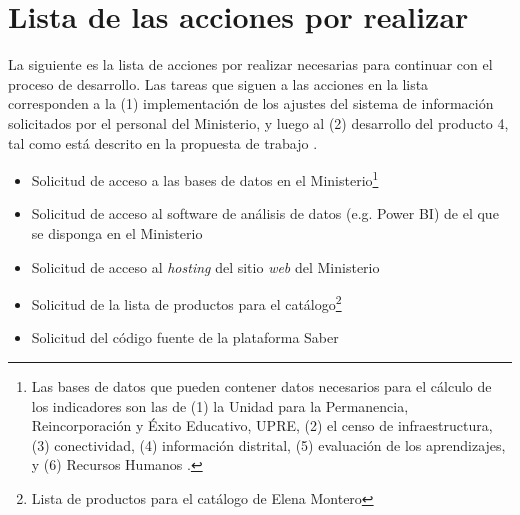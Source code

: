 \documentclass[9pt,a4paper]{IEEEtran}
\begin{document}
\section{Lista de las acciones por realizar}

La siguiente es la lista de acciones por realizar necesarias para continuar con el proceso de desarrollo. Las tareas que siguen a las acciones en la lista corresponden a la (1) implementaci\'on de los ajustes del sistema de informaci\'on solicitados por el personal del Ministerio, y luego al (2) desarrollo del producto 4, tal como est\'a descrito en la propuesta de trabajo \cite{prop}.

\begin{itemize}
	\item Solicitud de acceso a las bases de datos en el Ministerio\footnote{Las bases de datos que pueden contener datos necesarios para el c\'alculo de los indicadores son las de (1) la Unidad para la Permanencia, Reincorporaci\'on y \'Exito Educativo, UPRE, (2) el censo de infraestructura, (3) conectividad, (4) informaci\'on distrital, (5) evaluaci\'on de los aprendizajes, y (6) Recursos Humanos \cite{design}.}
	\item Solicitud de acceso al software de an\'alisis de datos (e.g. Power BI) de el que se disponga en el Ministerio
	\item Solicitud de acceso al \emph{hosting} del sitio \emph{web} del Ministerio
	\item Solicitud de la lista de productos para el cat\'alogo\footnote{Lista de productos para el cat\'alogo de Elena Montero}
	\item Solicitud del c\'odigo fuente de la plataforma Saber
\end{itemize}




\end{document}
